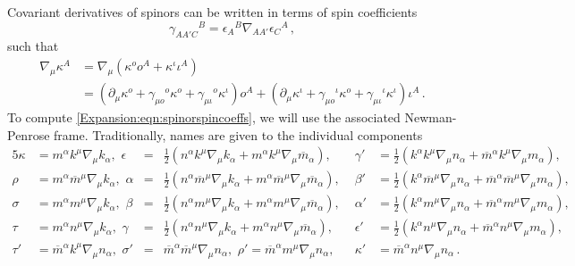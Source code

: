 	Covariant derivatives of spinors can be written in terms of spin coefficients
	\begin{equation}\label{Expansion:eqn:spinorspincoeffs}
	\gamma_{AA' C}{}^{B} = \epsilon_{A}{}^B \nabla_{AA'}\epsilon_{C}{}^A \, ,
	\end{equation}
	such that
	\begin{equation}
	\begin{aligned}
	\nabla_{\mu}\kappa^A &= \nabla_{\mu}\left(\kappa^o o^A + \kappa^{\iota}\iota^A\right) \\
	&= \left(\partial_{\mu}\kappa^o  + \gamma_{\mu o}{}^{o}\kappa^o + \gamma_{\mu \iota}{}^{o}\kappa^{\iota}\right) o^A + \left(\partial_{\mu} \kappa^{\iota}+ \gamma_{\mu o}{}^{\iota}\kappa^o + \gamma_{\mu \iota}{}^{\iota}\kappa^{\iota} \right) \iota^A \, .
	\end{aligned}
	\end{equation}
	To compute \eqref{Expansion:eqn:spinorspincoeffs}, we will use the associated Newman-Penrose frame. Traditionally, names are
	given to the individual components \cite{Penrose:1985bww}
	\begin{alignat}{5}
	\kappa &= m^{\alpha} k^{\mu} \nabla_{\mu} k_{\alpha}  , \, \,  \epsilon&=& \frac{1}{2}\left(n^{\alpha} k^{\mu} \nabla_{\mu} k_{\alpha} + m^{\alpha} k^{\mu} \nabla_{\mu} \overline{m}_{\alpha}\right)  , \, \, &\gamma'&= \frac{1}{2}\left(k^{\alpha} k^{\mu} \nabla_{\mu} n_{\alpha} + \overline{m}^{\alpha} k^{\mu} \nabla_{\mu} m_{\alpha}\right)  , \nonumber \\
	\rho &= m^{\alpha} \overline{m}^{\mu} \nabla_{\mu} k_{\alpha}  , \, \, \alpha &=& \frac{1}{2}\left(n^{\alpha} \overline{m}^{\mu} \nabla_{\mu} k_{\alpha} + m^{\alpha} \overline{m}^{\mu} \nabla_{\mu} \overline{m}_{\alpha}\right)  , \, \, &\beta'&  = \frac{1}{2}\left(k^{\alpha} \overline{m}^{\mu} \nabla_{\mu} n_{\alpha} + \overline{m}^{\alpha} \overline{m}^{\mu} \nabla_{\mu} m_{\alpha}\right) , \nonumber \\
	\sigma &= m^{\alpha} m^{\mu} \nabla_{\mu} k_{\alpha}  , \, \, \beta &=& \frac{1}{2}\left(n^{\alpha} m^{\mu} \nabla_{\mu} k_{\alpha} + m^{\alpha} m^{\mu} \nabla_{\mu} \overline{m}_{\alpha}\right) , \, \, &\alpha'&= \frac{1}{2}\left(k^{\alpha} m^{\mu} \nabla_{\mu} n_{\alpha} + \overline{m}^{\alpha} m^{\mu} \nabla_{\mu} m_{\alpha}\right) , \nonumber \\
	\tau &= m^{\alpha} n^{\mu} \nabla_{\mu} k_{\alpha}  , \, \, \gamma&=& \frac{1}{2}\left(n^{\alpha} n^{\mu} \nabla_{\mu} k_{\alpha} + m^{\alpha} n^{\mu} \nabla_{\mu} \overline{m}_{\alpha}\right)  , \, \, &\epsilon'&= \frac{1}{2}\left(k^{\alpha} n^{\mu} \nabla_{\mu} n_{\alpha} + \overline{m}^{\alpha} n^{\mu} \nabla_{\mu} m_{\alpha}\right)  , \nonumber \\
	\tau' &= \overline{m}^{\alpha} k^{\mu} \nabla_{\mu} n_{\alpha}  , \, \, \sigma' &=& \overline{m}^{\alpha} \overline{m}^{\mu} \nabla_{\mu} n_{\alpha}  , \, \, \rho'  = \overline{m}^{\alpha} m^{\mu} \nabla_{\mu} n_{\alpha}  , \, \, &\kappa'&  =\overline{m}^{\alpha} n^{\mu} \nabla_{\mu} n_{\alpha} \, . \label{Expansion:eqn:spincoeffssymbols}
	\end{alignat}
